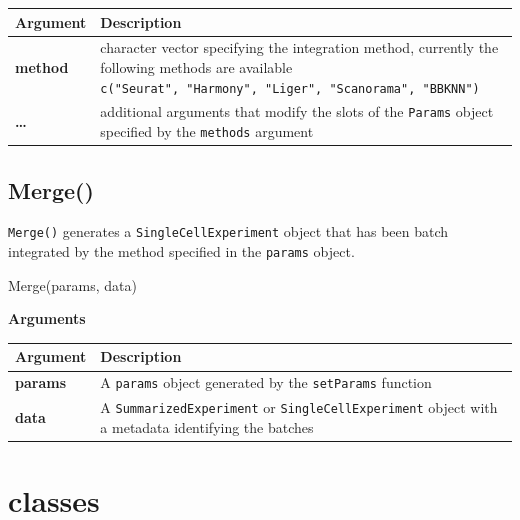 \documentclass[
]{book}
\newenvironment{Shaded}{\begin{snugshade}}{\end{snugshade}}
\newcommand{\FunctionTok}[1]{\textcolor[rgb]{0.00,0.00,0.00}{#1}}
\newcommand{\NormalTok}[1]{#1}
\begin{document}
\begin{longtable}[]{@{}
  >{\raggedright\arraybackslash}p{}
  >{\raggedright\arraybackslash}p{}@{}}
\toprule
Argument & Description \\
\midrule
\endhead
\textbf{method} & character vector specifying the integration method, currently the following methods are available \texttt{c("Seurat",\ "Harmony",\ "Liger",\ "Scanorama",\ "BBKNN")} \\
\textbf{\ldots{}} & additional arguments that modify the slots of the \texttt{Params} object specified by the \texttt{methods} argument \\
\bottomrule
\end{longtable}

\hypertarget{merge}{%
\section{Merge()}\label{merge}}

\texttt{Merge()} generates a \texttt{SingleCellExperiment} object that has been batch integrated by the method specified in the \texttt{params} object.

\begin{Shaded}
\begin{Highlighting}[]
\FunctionTok{Merge}\NormalTok{(params, data)}
\end{Highlighting}
\end{Shaded}

\textbf{Arguments}

\begin{longtable}[]{@{}
  >{\raggedright\arraybackslash}p{}
  >{\raggedright\arraybackslash}p{}@{}}
\toprule
Argument & Description \\
\midrule
\endhead
\textbf{params} & A \texttt{params} object generated by the \texttt{setParams} function \\
\textbf{data} & A \texttt{SummarizedExperiment} or \texttt{SingleCellExperiment} object with a metadata identifying the batches \\
\bottomrule
\end{longtable}

\hypertarget{classes}{%
\chapter{classes}\label{classes}}
\end{document}
